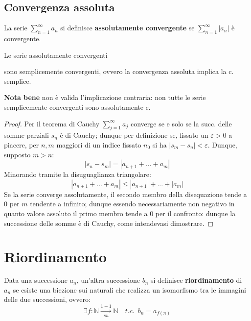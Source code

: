 \documentclass[10pt, oneside]{book}
\theoremstyle{plain}
\begin{document}
\subsection{Convergenza assoluta}
\begin{defin}
La serie $\sum_{n=1}^{\infty} a_n$ si definisce \textbf{assolutamente convergente} se $\sum_{n=1}^{\infty} |a_n|$ è convergente.
\end{defin}
\begin{ther}
\hypertarget{assolutamente}{Le serie assolutamente convergenti} sono semplicemente convergenti, ovvero la convergenza assoluta implica la c. semplice.
\end{ther}
\textbf{Nota bene} non è valida l'implicazione contraria: non tutte le serie semplicemente convergenti sono assolutamente c.
\begin{proof}
Per il teorema di Cauchy $\sum_{j=1}^{\infty} a_j$ converge se e solo se la succ. delle somme parziali $s_n$ è di Cauchy; dunque per definizione se, fissato un $\varepsilon > 0$ a piacere, per $n, m$ maggiori di un indice fissato $n_0$ si ha $|s_m - s_n| < \varepsilon$. Dunque, supposto $m > n$:
\[|s_n - s_m| = |a_{n+1} + ... + a_m|\]
Minorando tramite la disuguaglianza triangolare: 
\[|a_{n+1} + ... + a_m| \leq |a_{n+1}| + ... + |a_m|\]
Se la serie converge assolutamente, il secondo membro della disequazione tende a 0 per $m$ tendente a infinito; dunque essendo necessariamente non negativo in quanto valore assoluto il primo membro tende a 0 per il confronto: dunque la successione delle somme è di Cauchy, come intendevasi dimostrare.
\end{proof}

\section{Riordinamento}
\begin{defin}
    Data una successione $a_n$, un'altra successione $b_n$ si definisce \textbf{riordinamento} di $a_n$ se esiste una biezione sui naturali che realizza un isomorfismo tra le immagini delle due successioni, ovvero:
    \[\exists f : \mathbb{N} \xrightarrow[su]{1-1} \mathbb{N} \quad t.c. \enspace b_n = a_{f(n)}\]
\end{defin}
\end{document}
